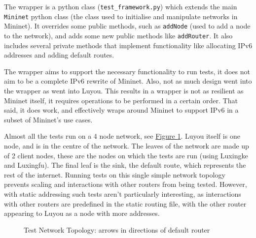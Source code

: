 \documentclass[12pt,a4paper,twoside,openany]{report}
\begin{document}
\bigskip

The wrapper is a python class (\verb!test_framework.py!) which extends the main \verb!Mininet! python class (the class used to initialise and manipulate networks in Mininet). It overrides some public methods, such as \verb!addNode! (used to add a node to the network), and adds some new public methods like \verb!addRouter!.  It also includes several private methods that implement functionality like allocating IPv6 addresses and adding default routes.  

\bigskip

The wrapper aims to support the necessary functionality to run tests, it does not aim to be a complete IPv6 rewrite of Mininet. Also, not as much design went into the wrapper as went into Luyou. This results in a wrapper is not as resilient as Mininet itself, it requires operations to be performed in a certain order.  That said, it does work, and effectively wraps around Mininet to support IPv6 in a subset of Mininet's use cases.

\bigskip

Almost all the tests run on a 4 node network, see \hyperref[fig::test_network]{Figure }\ref{fig::test_network}.  Luyou itself is one node, and is in the centre of the network.  The leaves of the network are made up of 2 client nodes, these are the nodes on which the tests are run (using Luxingke and Luxingfu).  The final leaf is the sink, the default route, which represents the rest of the internet.  Running tests on this single simple network topology prevents scaling and interactions with other routers from being tested. However, with static addressing such tests aren't particularly interesting, as interactions with other routers are predefined in the static routing file, with the other router appearing to Luyou as a node with more addresses.


\begin{figure}
\centering
{}
\caption{Test Network Topology: arrows in directions of default router}
\label{fig::test_network}
\end{figure}
\end{document}
